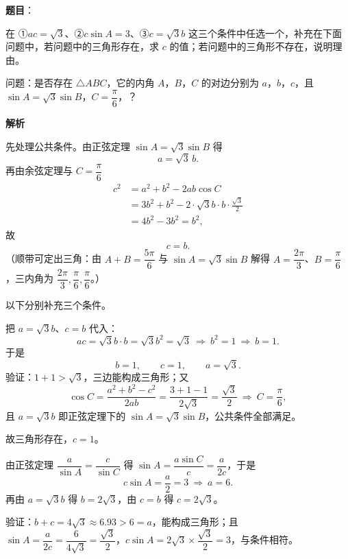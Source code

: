 \begin{answer}

\textbf{题目}：

在 ①$ac=\sqrt3$、②$c\sin A=3$、③$c=\sqrt3b$ 这三个条件中任选一个，补充在下面问题中，若问题中的三角形存在，求 $c$ 的值；若问题中的三角形不存在，说明理由。

问题：是否存在 $\triangle ABC$，它的内角 $A$，$B$，$C$ 的对边分别为 $a$，$b$，$c$，且 $\sin A=\sqrt3\sin B$，$C=\dfrac\pi6$，\gkblank{}？

\textbf{解析}

先处理公共条件。由正弦定理 $\sin A=\sqrt3\sin B$ 得
\nopagebreak[4]
\[a=\sqrt3\,b .\]
再由余弦定理与 $C=\dfrac\pi6$
\nopagebreak[4]
\[\begin{aligned}
c^2&=a^2+b^2-2ab\cos C\\
&=3b^2+b^2-2\cdot\sqrt3b\cdot b\cdot\frac{\sqrt3}2\\
&=4b^2-3b^2=b^2,
\end{aligned}\]
故
\nopagebreak[4]
\[c=b .\]
（顺带可定出三角：由 $A+B=\dfrac{5\pi}6$ 与 $\sin A=\sqrt3\sin B$ 解得 $A=\dfrac{2\pi}3$、$B=\dfrac\pi6$，三内角为 $\dfrac{2\pi}3,\dfrac\pi6,\dfrac\pi6$。）

以下分别补充三个条件。


把 $a=\sqrt3b$、$c=b$ 代入：
\nopagebreak[4]
\[ac=\sqrt3b\cdot b=\sqrt3b^2=\sqrt3\ \Longrightarrow\ b^2=1\ \Longrightarrow\ b=1 .\]
于是
\nopagebreak[4]
\[b=1,\qquad c=1,\qquad a=\sqrt3 .\]
验证：$1+1>\sqrt3$，三边能构成三角形；又
\nopagebreak[4]
\[\cos C=\frac{a^2+b^2-c^2}{2ab}=\frac{3+1-1}{2\sqrt3}=\frac{\sqrt3}2\ \Longrightarrow\ C=\frac\pi6,\]
且 $a=\sqrt3b$ 即正弦定理下的 $\sin A=\sqrt3\sin B$，公共条件全部满足。

故三角形存在，$c=1$。


由正弦定理 $\dfrac a{\sin A}=\dfrac c{\sin C}$ 得 $\sin A=\dfrac{a\sin C}{c}=\dfrac a{2c}$，于是
\nopagebreak[4]
\[c\sin A=\frac a2=3\ \Longrightarrow\ a=6 .\]
再由 $a=\sqrt3b$ 得 $b=2\sqrt3$，由 $c=b$ 得 $c=2\sqrt3$。

验证：$b+c=4\sqrt3\approx6.93>6=a$，能构成三角形；且 $\sin A=\dfrac a{2c}=\dfrac6{4\sqrt3}=\dfrac{\sqrt3}2$，$c\sin A=2\sqrt3\times\dfrac{\sqrt3}2=3$，与条件相符。


\end{answer}
